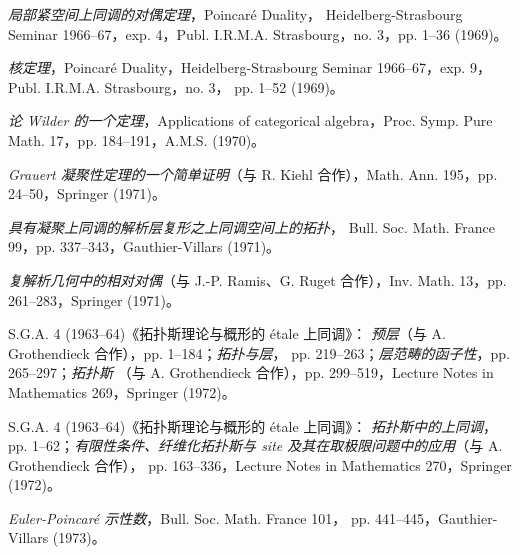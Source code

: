 \clearpage
{}
\small
\begin{description}
\item[{[12]}] \emph{局部紧空间上同调的对偶定理}，Poincaré Duality，
Heidelberg-Strasbourg Seminar 1966--67，exp. 4，Publ. I.R.M.A.
Strasbourg，no. 3，pp. 1--36 (1969)。

\item[{[13]}] \emph{核定理}，Poincaré Duality，Heidelberg-Strasbourg
Seminar 1966--67，exp. 9，Publ. I.R.M.A. Strasbourg，no. 3，
pp. 1--52 (1969)。

\item[{[14]}] \emph{论 Wilder 的一个定理}，Applications of categorical
algebra，Proc. Symp. Pure Math. 17，pp. 184--191，A.M.S. (1970)。

\item[{[15]}] \emph{Grauert 凝聚性定理的一个简单证明}（与 R. Kiehl
合作），Math. Ann. 195，pp. 24--50，Springer (1971)。

\item[{[16]}] \emph{具有凝聚上同调的解析层复形之上同调空间上的拓扑}，
Bull. Soc. Math. France 99，pp. 337--343，Gauthier-Villars (1971)。

\item[{[17]}] \emph{复解析几何中的相对对偶}（与 J.-P. Ramis、G. Ruget
合作），Inv. Math. 13，pp. 261--283，Springer (1971)。

\item[{[18]}] S.G.A. 4 (1963--64)《拓扑斯理论与概形的 étale 上同调》：
\emph{预层}（与 A. Grothendieck 合作），pp. 1--184；\emph{拓扑与层}，
pp. 219--263；\emph{层范畴的函子性}，pp. 265--297；\emph{拓扑斯}
（与 A. Grothendieck 合作），pp. 299--519，Lecture Notes in Mathematics
269，Springer (1972)。

\item[{[19]}] S.G.A. 4 (1963--64)《拓扑斯理论与概形的 étale 上同调》：
\emph{拓扑斯中的上同调}，pp. 1--62；\emph{有限性条件、纤维化拓扑斯与
site 及其在取极限问题中的应用}（与 A. Grothendieck 合作），
pp. 163--336，Lecture Notes in Mathematics 270，Springer (1972)。

\item[{[20]}] \emph{Euler-Poincaré 示性数}，Bull. Soc. Math. France 101，
pp. 441--445，Gauthier-Villars (1973)。


\end{description}
